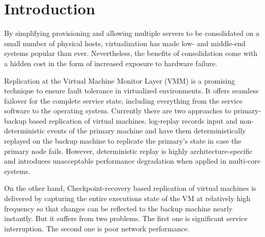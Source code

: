\section{Introduction} \label{sec:intro}

By simplifying provisioning and allowing multiple servers to be consolidated on a 
small number of physical hosts, virtualization has made low- and middle-end systems 
popular than ever. Nevertheless, the benefits of consolidation come with a hidden cost 
in the form of increased exposure to hardware failure. 



Replication at the Virtual Machine Monitor Layer (VMM) is a promising technique to 
ensure fault tolerance in virtualized environments. It offers seamless failover for the 
complete service state, including everything from the service software to the operating system. 
Currently there are two approaches to primary-backup based replication of virtual machines.
log-replay records input and non-deterministic events of the primary machine 
and have them deterministically replayed on the backup machine to replicate the primary's state 
in case the primary node fails. However, deterministic replay is highly architecture-specific and 
introduces unacceptable performance degradation when applied in multi-core systems.

On the other hand, Checkpoint-recovery based replication of virtual machines is delivered by 
capturing the entire executions state of the VM at relatively high frequency so that changes can 
be reflected to the backup machine nearly instantly. But it suffers from two problems. The first one 
is significant service interruption. The second one is poor network performance.

